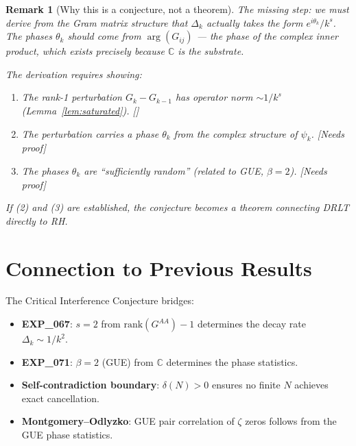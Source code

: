 \documentclass[11pt]{article}
\newtheorem{remark}[theorem]{Remark}
\begin{document}
\begin{remark}[Why this is a conjecture, not a theorem]
The missing step: we must derive from the Gram matrix structure
that $\Delta_k$ actually takes the form $e^{i\theta_k}/k^s$.
The phases $\theta_k$ should come from $\arg(G_{ij})$ ---
the phase of the complex inner product, which exists precisely
because $\mathbb{C}$ is the substrate.

The derivation requires showing:
\begin{enumerate}
  \item The rank-1 perturbation $G_{k} - G_{k-1}$ has
    operator norm $\sim 1/k^s$ (Lemma~\ref{lem:saturated}). [\checkmark]
  \item The perturbation carries a phase $\theta_k$ from the
    complex structure of $\psi_{k}$. [Needs proof]
  \item The phases $\theta_k$ are ``sufficiently random''
    (related to GUE, $\beta = 2$). [Needs proof]
\end{enumerate}
If (2) and (3) are established, the conjecture becomes
a theorem connecting DRLT directly to RH.
\end{remark}

\section{Connection to Previous Results}

The Critical Interference Conjecture bridges:
\begin{itemize}
  \item \textbf{EXP\_067}: $s = 2$ from $\mathrm{rank}(G^{AA}) - 1$
    determines the decay rate $\Delta_k \sim 1/k^2$.
  \item \textbf{EXP\_071}: $\beta = 2$ (GUE) from $\mathbb{C}$
    determines the phase statistics.
  \item \textbf{Self-contradiction boundary}: $\delta(N) > 0$
    ensures no finite $N$ achieves exact cancellation.
  \item \textbf{Montgomery--Odlyzko}: GUE pair correlation
    of $\zeta$ zeros follows from the GUE phase statistics.
\end{itemize}
\end{document}

